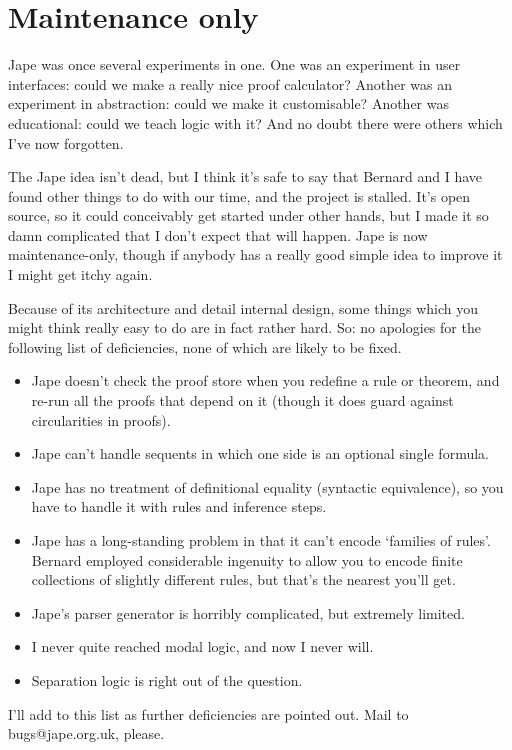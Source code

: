 \section*{Maintenance only}

Jape was once several experiments in one. One was an experiment in user interfaces: could we make a really nice proof calculator? Another was an experiment in abstraction: could we make it customisable? Another was educational: could we teach logic with it? And no doubt there were others which I've now forgotten.

The Jape idea isn't dead, but I think it's safe to say that Bernard and I have found other things to do with our time, and the project is stalled. It's open source, so it could conceivably get started under other hands, but I made it so damn complicated that I don't expect that will happen. Jape is now maintenance-only, though if anybody has a really good simple idea to improve it I might get itchy again.

Because of its architecture and detail internal design, some things which you might think really easy to do are in fact rather hard. So: no apologies for the following list of deficiencies, none of which are likely to be fixed.

\begin{itemize}
\item Jape doesn't check the proof store when you redefine a rule or theorem, and re-run all the proofs that depend on it (though it does guard against circularities in proofs).
\item Jape can't handle sequents in which one side is an optional single formula.
\item Jape has no treatment of definitional equality (syntactic equivalence), so you have to handle it with rules and inference steps.
\item Jape has a long-standing problem in that it can't encode `families of rules'. Bernard employed considerable ingenuity to allow you to encode finite collections of slightly different rules, but that's the nearest you'll get.
\item Jape's parser generator is horribly complicated, but extremely limited.
\item I never quite reached modal logic, and now I never will.
\item Separation logic is right out of the question.
\end{itemize}

I'll add to this list as further deficiencies are pointed out. Mail to bugs@jape.org.uk, please.

